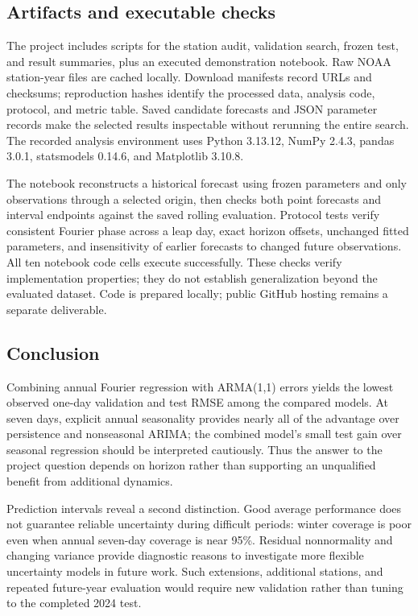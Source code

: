 \documentclass{article}
\begin{document}
\subsection{Artifacts and executable checks}
The project includes scripts for the station audit, validation search, frozen
test, and result summaries, plus an executed demonstration notebook.
Raw NOAA station-year files are cached locally. Download manifests record URLs
and checksums; reproduction hashes identify the processed data, analysis code,
protocol, and metric table. Saved candidate forecasts and JSON parameter records
make the selected results inspectable without rerunning the entire search.
The recorded analysis environment uses Python 3.13.12, NumPy 2.4.3,
pandas 3.0.1, statsmodels 0.14.6, and Matplotlib 3.10.8.

The notebook reconstructs a historical forecast using frozen parameters and
only observations through a selected origin, then checks both point forecasts
and interval endpoints against the saved rolling evaluation. Protocol tests
verify consistent Fourier phase across a leap day, exact horizon offsets,
unchanged fitted parameters, and insensitivity of earlier forecasts to changed
future observations. All ten notebook code cells execute successfully. These
checks verify implementation properties; they do not establish generalization
beyond the evaluated dataset. Code is prepared locally; public GitHub hosting
remains a separate deliverable.

\subsection{Conclusion}
Combining annual Fourier regression with ARMA(1,1) errors yields the lowest
observed one-day validation and test RMSE among the compared models.
At seven days, explicit annual seasonality provides nearly all of the advantage
over persistence and nonseasonal ARIMA; the combined model's small test gain
over seasonal regression should be interpreted cautiously. Thus the answer to
the project question depends on horizon rather than supporting an unqualified
benefit from additional dynamics.

Prediction intervals reveal a second distinction. Good average performance
does not guarantee reliable uncertainty during difficult periods: winter
coverage is poor even when annual seven-day coverage is near 95\%. Residual
nonnormality and changing variance provide diagnostic reasons to investigate
more flexible uncertainty models in future work. Such extensions, additional
stations, and repeated future-year evaluation would require new validation
rather than tuning to the completed 2024 test.
\end{document}
